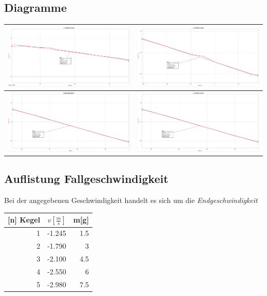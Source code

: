 \subsection{Diagramme}

\begin{tabular}{|l|l|}
	\hline
	\includegraphics[width=8cm]{graphs/scr1} &
	\includegraphics[width=8cm]{graphs/scr2}
	\\\hline 
	\includegraphics[width=8cm]{graphs/scr3} &
	\includegraphics[width=8cm]{graphs/scr4}
	\\\hline 
	
\end{tabular}


\subsection{Auflistung Fallgeschwindigkeit}

Bei der angegebenen Geschwindigkeit handelt es sich um die \textit{Endgeschwindigkeit}

\begin{tabular}{rrr}
	\textbf{[n] Kegel} & \(v[\frac{m}{s}]\) & m[g] \\ \hline
	1 & -1.245 & 1.5 \\
	2 & -1.790 & 3 \\
	3 & -2.100 & 4.5 \\
	4 & -2.550 & 6 \\
	5 & -2.980 & 7.5 \\
\end{tabular}